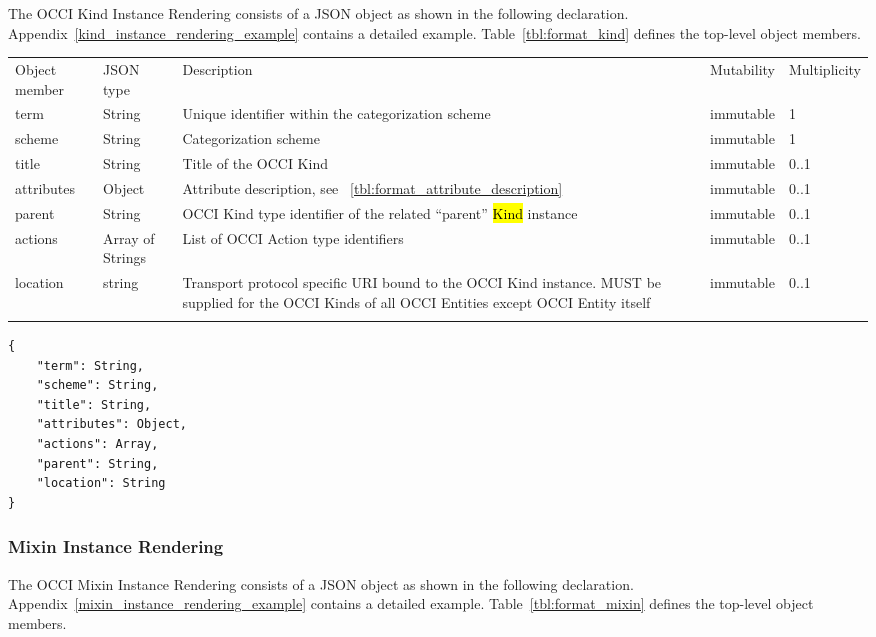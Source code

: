 \documentclass[10pt,a4paper]{article}
\begin{document}
The OCCI Kind Instance Rendering consists of a JSON object as shown in the
following declaration. Appendix~\ref{kind_instance_rendering_example} contains a detailed example.
Table~\ref{tbl:format_kind} defines the top-level object members.

 {
    \begin{tabularx}{\textwidth}{llXll}
    \toprule
    Object member & JSON type & Description & Mutability & Multiplicity \\
    \colrule
    term & String & Unique identifier within the categorization scheme &
immutable & 1 \\

    scheme & String & Categorization scheme & immutable & 1 \\

    title & String & Title of the OCCI Kind & immutable & 0..1 \\

    attributes & Object & Attribute description, see
~\ref{tbl:format_attribute_description} & immutable & 0..1 \\

    parent & String & OCCI Kind type identifier of the
related ``parent'' \hl{Kind} instance & immutable & 0..1 \\

    actions & Array of Strings & List of OCCI Action type
identifiers & immutable & 0..1 \\

    location & string & Transport protocol specific URI bound to the OCCI Kind
instance. MUST be supplied for the OCCI Kinds of all OCCI Entities except OCCI
Entity itself & immutable & 0..1 \\
    \botrule
    \end{tabularx}
}

\begin{lstlisting}
{
    "term": String,
    "scheme": String,
    "title": String,
    "attributes": Object,
    "actions": Array,
    "parent": String,
    "location": String
}
\end{lstlisting}

\subsubsection{Mixin Instance Rendering}
\label{sec:format_mixin}

The OCCI Mixin Instance Rendering consists of a JSON object as shown in the following declaration. Appendix~\ref{mixin_instance_rendering_example} contains a detailed example.
Table~\ref{tbl:format_mixin} defines the top-level object members.
\end{document}
